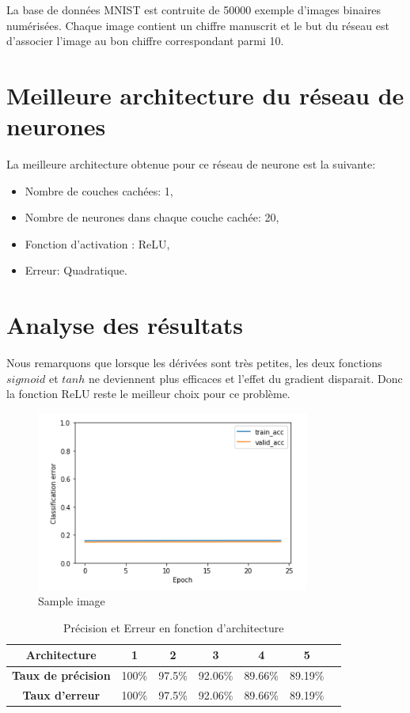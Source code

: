 \documentclass[a4paper,english,12pt]{article}
\begin{document}
La base de données MNIST est contruite de 50000 exemple d'images binaires numérisées. Chaque image contient un chiffre manuscrit et le but du réseau est d'associer l'image au bon chiffre correspondant parmi 10. 


\section{Meilleure architecture du réseau de neurones}
La meilleure architecture obtenue pour ce réseau de neurone est la suivante: 
\begin{itemize}
	\item Nombre de couches cachées: 1,
	\item Nombre de neurones dans chaque couche cachée: 20,
	\item Fonction d'activation : ReLU,
	\item Erreur: Quadratique.
\end{itemize}

\section{Analyse des résultats}
Nous remarquons que lorsque les dérivées sont très petites, les deux fonctions $sigmoid$ et $tanh$ ne deviennent plus efficaces et l'effet du gradient disparait. Donc la fonction ReLU reste le meilleur choix pour ce problème.


\begin{figure}[H]
	\centering
	\includegraphics[width=0.8\textwidth,keepaspectratio]{Error}
	\caption{Sample image\label{img1}}
\end{figure}

\begin{table}[H]\centering
	\begin{tabular}{ccccccc}
		\toprule \textbf{Architecture} & 1 & 2 & 3 & 4 & 5\\    \midrule
		\textbf{Taux de précision} & 100\% & 97.5\% & 92.06\% & 89.66\% & 89.19\%  
		\\    \midrule
		\textbf{Taux d'erreur} & 100\% & 97.5\% & 92.06\% & 89.66\% & 89.19\% \\   
		\bottomrule	
	\end{tabular}
	\caption{Précision et Erreur en fonction d'architecture\label{tab1}}
\end{table}
\end{document}
